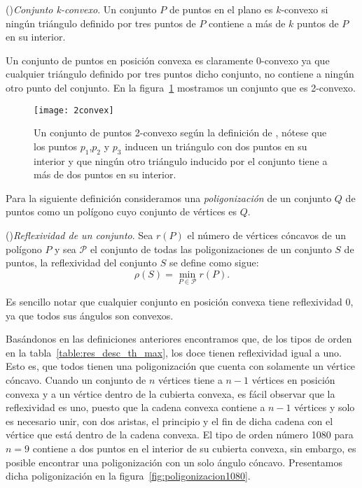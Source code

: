   \begin{definition}{(\cite{Valtr2002})\emph{Conjunto k-convexo}.}
    Un conjunto $P$ de puntos en el plano es $k$-convexo si ningún triángulo definido por tres
    puntos de $P$ contiene a más de $k$ puntos de $P$ en su interior.
  \end{definition}
  Un conjunto de puntos en posición convexa es claramente 0-convexo ya que cualquier triángulo
  definido por tres puntos dicho conjunto, no contiene a ningún otro punto del conjunto. En la
  figura~\ref{fig:2convex} mostramos un conjunto que es 2-convexo.

  \begin{figure}
    \centering
    \texttt{[image: 2convex]}
    \caption{Un conjunto de puntos 2-convexo según la definición de \cite{Valtr2002}, nótese que
    los puntos $p_1$,$p_2$ y $p_3$ inducen un triángulo con dos puntos en su interior y que ningún
    otro triángulo inducido por el conjunto tiene a más de dos puntos en su interior.}
    \label{fig:2convex}
  \end{figure}

  Para la siguiente definición consideramos una \emph{poligonización} de un conjunto $Q$ de
  puntos como un polígono cuyo conjunto de vértices es $Q$.

  \begin{definition}{(\cite{Arkin2003})\emph{Reflexividad de un conjunto}.}
    Sea $r(P)$ el número de vértices cóncavos de un polígono $P$ y sea $\mathcal{P}$ el conjunto de
    todas las poligonizaciones de un conjunto $S$ de puntos, la reflexividad del conjunto $S$ se
    define como sigue: \[ \rho(S) = \min_{P\in \mathcal{P}} r(P).\]
  \end{definition}

  Es sencillo notar que cualquier conjunto en posición convexa tiene reflexividad 0, ya que todos
  sus ángulos son convexos.

  Basándonos en las definiciones anteriores encontramos que, de los tipos de orden en la
  tabla~\ref{table:res_desc_th_max}, los doce tienen reflexividad igual a uno. Esto es, que todos
  tienen una poligonización que cuenta con solamente un vértice cóncavo. Cuando un conjunto de $n$
  vértices tiene a $n-1$ vértices en posición convexa y a un vértice dentro de la cubierta convexa,
  es fácil observar que la reflexividad es uno, puesto que la cadena convexa contiene a $n-1$
  vértices y solo es necesario unir, con dos aristas, el principio y el fin de dicha cadena con el
  vértice que está dentro de la cadena convexa. El tipo de orden número 1080 para $n=9$ contiene a
  dos puntos en el interior de su cubierta convexa, sin embargo, es posible encontrar una
  poligonización con un solo ángulo cóncavo. Presentamos dicha poligonización en la
  figura~\ref{fig:poligonizacion1080}.

